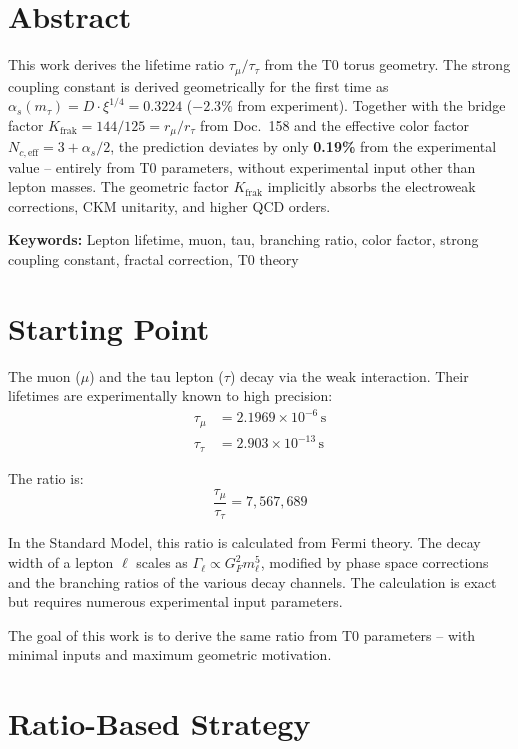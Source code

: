 
	\section*{Abstract}
	This work derives the lifetime ratio $\tau_\mu/\tau_\tau$ from the T0 torus geometry. The strong coupling constant is derived geometrically for the first time as $\alpha_s(m_\tau) = D \cdot \xi^{1/4} = 0.3224$ ($-2.3\%$ from experiment). Together with the bridge factor $K_\text{frak} = 144/125 = r_\mu/r_\tau$ from Doc.~158 and the effective color factor $N_{c,\text{eff}} = 3 + \alpha_s/2$, the prediction deviates by only \textbf{0.19\%} from the experimental value -- entirely from T0 parameters, without experimental input other than lepton masses. The geometric factor $K_\text{frak}$ implicitly absorbs the electroweak corrections, CKM unitarity, and higher QCD orders.
	
	\textbf{Keywords:} Lepton lifetime, muon, tau, branching ratio, color factor, strong coupling constant, fractal correction, T0 theory
	
	
	\section{Starting Point}
	
	The muon ($\mu$) and the tau lepton ($\tau$) decay via the weak interaction. Their lifetimes are experimentally known to high precision:
	\begin{align}
		\tau_\mu &= 2.1969 \times 10^{-6} \, \text{s} \\
		\tau_\tau &= 2.903 \times 10^{-13} \, \text{s}
	\end{align}
	
	The ratio is:
	\begin{equation}
		\frac{\tau_\mu}{\tau_\tau} = 7{,}567{,}689
	\end{equation}
	
	In the Standard Model, this ratio is calculated from Fermi theory. The decay width of a lepton $\ell$ scales as $\Gamma_\ell \propto G_F^2 m_\ell^5$, modified by phase space corrections and the branching ratios of the various decay channels. The calculation is exact but requires numerous experimental input parameters.
	
	The goal of this work is to derive the same ratio from T0 parameters -- with minimal inputs and maximum geometric motivation.
	
	
	\section{Ratio-Based Strategy}
	
